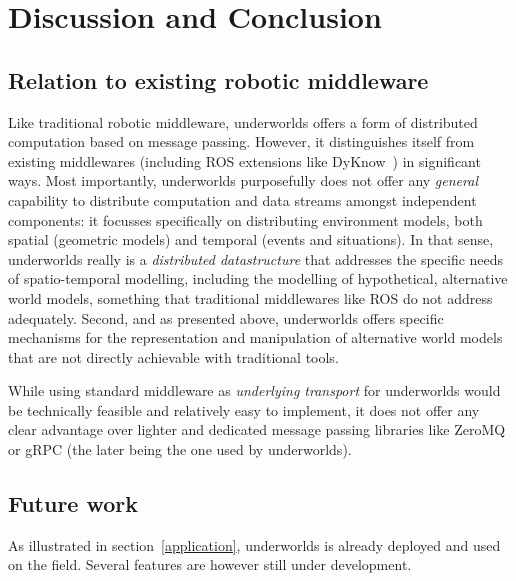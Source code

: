 \documentclass[letterpaper, 10pt, conference]{ieeeconf}
\newcommand{\uwds}{{\sc underworlds}\xspace}
\begin{document}
\section{Discussion and Conclusion}

\subsection{Relation to existing robotic middleware}

Like traditional robotic middleware, \uwds offers a form of distributed
computation based on message passing. However, it distinguishes itself from
existing middlewares (including ROS extensions like
DyKnow~\cite{de_leng_dyknow:_2016}) in significant ways. Most importantly,
\uwds purposefully does not offer any \emph{general} capability to distribute
computation and data streams amongst independent components: it focusses
specifically on distributing environment models, both spatial (geometric
models) and temporal (events and situations). In that sense, \uwds really is a
\emph{distributed datastructure} that addresses the specific needs of
spatio-temporal modelling, including the modelling of hypothetical, alternative
world models, something that traditional middlewares like ROS do not address
adequately. Second, and as presented above, \uwds offers specific mechanisms
for the representation and manipulation of alternative world models that are
not directly achievable with traditional tools.

While using standard middleware as \emph{underlying transport} for \uwds would be
technically feasible and relatively easy to implement, it does not offer any
clear advantage over lighter and dedicated message passing libraries like ZeroMQ
or gRPC (the later being the one used by \uwds).


\subsection{Future work}
\label{futurework}

As illustrated in section~\ref{application}, \uwds is already deployed and used
on the field. Several features are however still under development.
\end{document}
